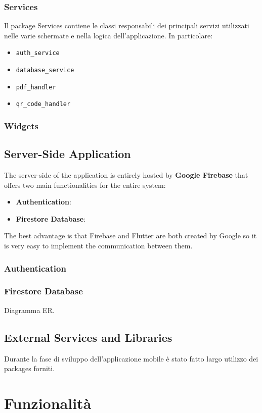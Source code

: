 \documentclass[12pt,a4paper,twoside,openright,titlepage]{book}
\begin{document}
\subsection{Services}
Il package Services contiene le classi responsabili dei principali servizi utilizzati nelle varie schermate e nella logica dell'applicazione. In particolare:
\begin{itemize}
\item \texttt{auth\_service}
\item \texttt{database\_service}
\item \texttt{pdf\_handler}
\item \texttt{qr\_code\_handler}
\end{itemize}

\subsection{Widgets}

\section{Server-Side Application}
The server-side of the application is entirely hosted by \textbf{Google Firebase} that offers two main functionalities for the entire system:
\begin{itemize}
\item \textbf{Authentication}:
\item \textbf{Firestore Database}:
\end{itemize}
The best advantage is that Firebase and Flutter are both created by Google so it is very easy to implement the communication between them.

\subsection{Authentication}

\subsection{Firestore Database}
Diagramma ER.

\section{External Services and Libraries}
Durante la fase di sviluppo dell'applicazione mobile è stato fatto largo utilizzo dei packages forniti.


\chapter{Funzionalità}
\end{document}

